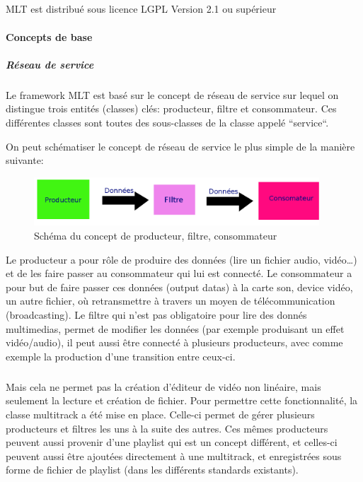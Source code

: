 \subparagraph{}

MLT est distribué sous licence LGPL Version 2.1 ou supérieur

\paragraph{Concepts de base}

\subparagraph{Réseau de service}

\subparagraph{}

Le framework MLT est basé sur le concept de réseau de service
sur lequel on distingue trois entités (classes) clés: producteur, filtre
et consommateur. Ces différentes classes sont toutes des sous-classes
de la classe appelé ``service``.

On peut schématiser le concept de réseau de service le plus simple de
la manière suivante:

\begin{figure} [H]

  \begin{center}

    \includegraphics[width=0.95\textwidth]{images/producerConsumer}

  \end{center}

  \caption{Schéma du concept de producteur, filtre, consommateur}

  \label{Yes}

\end{figure}

Le producteur a pour rôle de produire des données (lire un fichier
audio, vidéo\ldots) et de les faire passer au consommateur qui lui
est connecté. Le consommateur a pour but de faire passer ces données
(output datas) à la carte son, device vidéo, un autre fichier, où
retransmettre à travers un moyen de télécommunication (broadcasting).
Le filtre qui n'est pas obligatoire pour lire des donnés multimedias,
permet de modifier les données (par exemple produisant un effet
vidéo/audio), il peut aussi être connecté à plusieurs producteurs,
avec comme exemple la production d'une transition entre ceux-ci.

\subparagraph{}

Mais cela ne permet pas la création d'éditeur de vidéo non linéaire,
mais seulement la lecture et création de fichier. Pour permettre cette
fonctionnalité, la classe multitrack a été mise en place. Celle-ci
permet de gérer plusieurs producteurs et filtres les uns à la suite des
autres. Ces mêmes producteurs peuvent aussi provenir d'une playlist qui
est un concept différent, et celles-ci peuvent aussi être ajoutées
directement à une multitrack, et enregistrées sous forme de fichier
de playlist (dans les différents standards existants).


